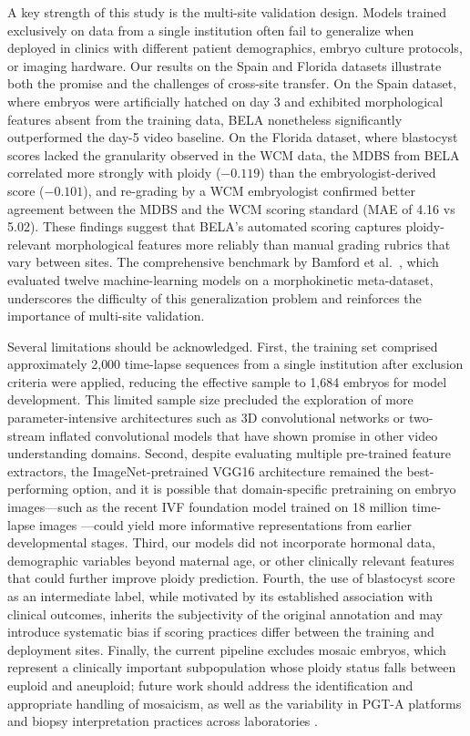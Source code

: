\documentclass[11pt]{article}
\begin{document}
A key strength of this study is the multi-site validation design. Models trained exclusively on data from a single institution often fail to generalize when deployed in clinics with different patient demographics, embryo culture protocols, or imaging hardware. Our results on the Spain and Florida datasets illustrate both the promise and the challenges of cross-site transfer. On the Spain dataset, where embryos were artificially hatched on day 3 and exhibited morphological features absent from the training data, BELA nonetheless significantly outperformed the day-5 video baseline. On the Florida dataset, where blastocyst scores lacked the granularity observed in the WCM data, the MDBS from BELA correlated more strongly with ploidy ($-0.119$) than the embryologist-derived score ($-0.101$), and re-grading by a WCM embryologist confirmed better agreement between the MDBS and the WCM scoring standard (MAE of 4.16 vs 5.02). These findings suggest that BELA's automated scoring captures ploidy-relevant morphological features more reliably than manual grading rubrics that vary between sites. The comprehensive benchmark by Bamford et al.\ \citep{bamford2023ml12}, which evaluated twelve machine-learning models on a morphokinetic meta-dataset, underscores the difficulty of this generalization problem and reinforces the importance of multi-site validation.

Several limitations should be acknowledged. First, the training set comprised approximately 2{,}000 time-lapse sequences from a single institution after exclusion criteria were applied, reducing the effective sample to 1{,}684 embryos for model development. This limited sample size precluded the exploration of more parameter-intensive architectures such as 3D convolutional networks or two-stream inflated convolutional models that have shown promise in other video understanding domains. Second, despite evaluating multiple pre-trained feature extractors, the ImageNet-pretrained VGG16 architecture remained the best-performing option, and it is possible that domain-specific pretraining on embryo images---such as the recent IVF foundation model trained on 18 million time-lapse images \citep{rajendran2025femi}---could yield more informative representations from earlier developmental stages. Third, our models did not incorporate hormonal data, demographic variables beyond maternal age, or other clinically relevant features that could further improve ploidy prediction. Fourth, the use of blastocyst score as an intermediate label, while motivated by its established association with clinical outcomes, inherits the subjectivity of the original annotation and may introduce systematic bias if scoring practices differ between the training and deployment sites. Finally, the current pipeline excludes mosaic embryos, which represent a clinically important subpopulation whose ploidy status falls between euploid and aneuploid; future work should address the identification and appropriate handling of mosaicism, as well as the variability in PGT-A platforms and biopsy interpretation practices across laboratories \citep{zou2022timelapse}.
\end{document}
